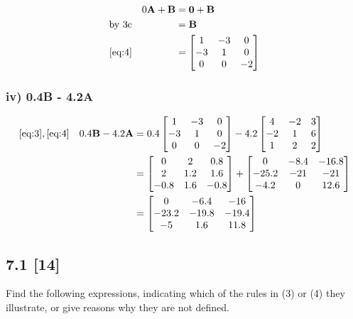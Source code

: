 \documentclass{article}
\begin{document}
\begin{align}
    \label{eq:10} 
    && 0\textbf{A} + \textbf{B} &= \textbf{0} + \textbf{B}
    \\
    \label{eq:11}
    \text{by 3c} && &= \textbf{B}
    \\
    \label{eq:12}
    \eqref{eq:4} && &= \begin{bmatrix} 1 & -3 & 0\\ -3 & 1 & 0\\ 0 & 0 & -2 \end{bmatrix}
\end{align}

\subsubsection*{iv) 0.4\textbf{B} - 4.2\textbf{A}}

\begin{align}
    \label{eq:13}
    \eqref{eq:3}, \eqref{eq:4} && 0.4\textbf{B} - 4.2\textbf{A} &= 0.4\begin{bmatrix} 1 & -3 & 0\\ -3 & 1 & 0\\ 0 & 0 & -2 \end{bmatrix} -4.2\begin{bmatrix} 4 & -2 & 3\\ -2 & 1 & 6\\ 1 & 2 & 2 \end{bmatrix}
    \\
    \label{eq:14}
    && &= 
    \begin{bmatrix}
    0 & 2 & 0.8\\
    2 & 1.2 & 1.6\\
    -0.8 & 1.6 & -0.8
    \end{bmatrix}
    +
    \begin{bmatrix}
    0 & -8.4 & -16.8\\
    -25.2 & -21 & -21\\
    -4.2 & 0 & 12.6
    \end{bmatrix}
    \\
    \label{eq:15}
    && &=
    \begin{bmatrix}
    0 & -6.4 & -16\\
    -23.2 & -19.8 & -19.4\\
    -5 & 1.6 & 11.8
    \end{bmatrix}
\end{align}

\subsection*{7.1 [14]}
\setcounter{equation}{0}

\par Find the following expressions, indicating which of the rules in (3) or (4) they illustrate, or give reasons why they are not defined.

\def \umatrix {
\begin{bmatrix}
1.5\\
0\\
-3.0
\end{bmatrix}
}
\def \vmatrix {
\begin{bmatrix}
-1\\
3\\
2
\end{bmatrix}
}
\def \wmatrix {
\begin{bmatrix}
-5\\
-30\\
10
\end{bmatrix}
}
\def \Ematrix {
\begin{bmatrix}
0 & 2\\
3 & 4\\
3 & -1
\end{bmatrix}
}
\end{document}
